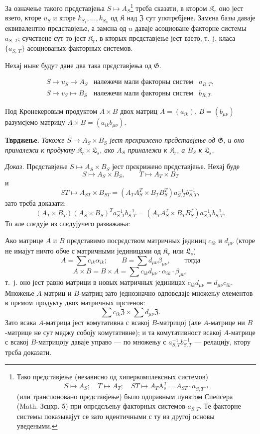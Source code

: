 \documentclass[11pt]{article}
\newcommand{\srcfn}[2]{\footnote{#2}}
\begin{document}
За означење такого прєдставјења \(S\mapsto A_S\)\srcfn{1}{Тако прєдставјење (независно од хиперкомплексных системов)
\[
S\mapsto A_S;\quad T\mapsto A_T;\quad ST\mapsto A_T\mathrm{A}_s^T=A_{ST}\cdot a_{S,T^{-1}}
\]
(или транспоновано прєдставјење) было одправным пунктом Спеисера (Math. Зсцхр. 5) при опрєдєљењу факторных системов \(a_{S,T}\). Те факторне системы показывајут се зато идентичными с ту из другој основы уведеными.} трєба сказати, в ктором \(\mathfrak K_r\) оно јест взето, кторе \(u_S\) и кторе \(k_{S_1},\ldots,k_{S_n}\) од \(\mathfrak K\) над \(\mathfrak Z\) сут употрєбјене. Замєна базы даваје еквивалентно прєдставјење, а замєна од \(u\) даваје асоциоване факторне системы \(a_{S,\,T}\); сучствене сут то јест \(\mathfrak K_r\), в кторых прєдставјење јест взето, т.~ј. класа \(\{a_{S,\,T}\}\) асоциованых факторных системов.

Нехај нынє будут дане два така прєдставјења од \(\mathfrak G\).

\[
\begin{array}{lll}
S\mapsto u_S\mapsto A_S & \text{належечи мали факторны систем} & a_{R,T},\\
S\mapsto v_S\mapsto B_S & \text{належечи мали факторны систем} & b_{R,T}.
\end{array}
\]

Под Кронекеровым продуктом \(A\times B\) двох матриц \(A=(a_{ik})\), \(B=(b_{\mu\nu})\) разумєјемо матрицу \(A\times B=(a_{ik}b_{\mu\nu})\).

\noindent\textbf{Тврджење.} \emph{Такоже \(S\to A_S\times B_S\) јест прєкрижено прєдставјење од \(\mathfrak G\), и оно приналежи к продукту \(\mathfrak K_r\times\mathfrak L_s\), ако \(A_S\) приналежи к \(\mathfrak K_r\), а \(B_S\) к \(\mathfrak L_s\).}

\noindent\emph{Доказ.} Прєдставјење \(S\mapsto A_S\times B_S\) јест прєкрижено прєдставјење. Нехај буде
\[
S\mapsto A_S\times B_S,\qquad T\mapsto A_T\times B_T
\]
и
\[
ST\mapsto A_{ST}\times B_{ST}
=(A_TA_S^T\times B_TB_S^T)a_{S,T}^{-1}b_{S,T}^{-1},
\]
зато трєба доказати:
\[
(A_T\times B_T)(A_S\times B_S)^T a_{S,T}^{-1}b_{S,T}^{-1}
=(A_TA_S^T\times B_TB_S^T)a_{S,T}^{-1}b_{S,T}^{-1}.
\]
То але слєдује из слєдујучего разважања:

Ако матрице \(A\) и \(B\) прєдставимо посрєдством матричных јединиц \(c_{ik}\) и \(d_{\mu\nu}\) (кторе не имајут ничто обче с матричными јединицами од \(\mathfrak K_r\) или \(\mathfrak L_s\))
\[
A=\sum c_{ik}\alpha_{ik};\qquad
B=\sum d_{\mu\nu}\beta_{\mu\nu},\qquad\text{тогда}
\]
\[
A\times B=B\times A
=\sum c_{ik}d_{\mu\nu}\cdot\alpha_{ik}\cdot\beta_{\mu\nu},
\]
т.~ј. оно јест равно матрици в новых матричных јединицах
\(c_{ik}d_{\mu\nu}=d_{\mu\nu}c_{ik}\). Множење \(A\)-матриц и \(B\)-матриц зато једнозначно одповєдаје множењу елементов в прємом продукту двох матричных прстенов:
\[
\sum c_{ik}\mathfrak Z\times\sum d_{\mu\nu}\mathfrak Z.
\]
Зато всака \(A\)-матрица јест комутативна с всакој \(B\)-матрицој (але \(A\)-матрице ни \(B\)-матрице не сут меджу собоју комутативне); и та комутативност всакој \(A\)-матрице с всакој \(B\)-матрицоју даваје управо --- по множењу с \(a_{S,T}^{-1}b_{S,T}^{-1}\) --- релацију, ктору трєба доказати.
\end{document}
